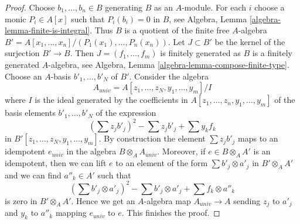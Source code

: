 \documentclass[10pt,a4paper]{amsart}
\theoremstyle{plain}
\theoremstyle{definition}
\theoremstyle{remark}
\numberwithin{equation}{subsection}
\begin{document}
\begin{proof}
Choose $b_1, \ldots, b_n \in B$ generating $B$ as an $A$-module.
For each $i$ choose a monic $P_i \in A[x]$ such that $P_i(b_i) = 0$
in $B$, see Algebra, Lemma \ref{algebra-lemma-finite-is-integral}.
Thus $B$ is a quotient of the finite free $A$-algebra
$B' = A[x_1, \ldots, x_n]/(P_1(x_1), \ldots, P_n(x_n))$.
Let $J \subset B'$ be the kernel of the surjection $B' \to B$.
Then $J =(f_1, \ldots, f_m)$ is finitely generated as $B$
is a finitely generated $A$-algebra, see
Algebra, Lemma \ref{algebra-lemma-compose-finite-type}.
Choose an $A$-basis $b'_1, \ldots, b'_N$ of $B'$.
Consider the algebra
$$
A_{univ} = A[z_1, \ldots, z_N, y_1, \ldots, y_m]/I
$$
where $I$ is the ideal generated by the coefficients in
$A[z_1, \ldots, z_n, y_1, \ldots, y_m]$
of the basis elements $b'_1, \ldots, b'_N$ of the expression
$$
(\sum z_j b'_j)^2 - \sum z_j b'_j + \sum y_k f_k
$$
in $B'[z_1, \ldots, z_N, y_1, \ldots, y_m]$. By construction
the element $\sum z_j b'_j$ maps to an idempotent $e_{univ}$ in the
algebra $B \otimes_A A_{univ}$. Moreover, if $e \in B \otimes_A A'$
is an idempotent, then we can lift $e$ to an element of the form
$\sum b'_j \otimes a'_j$ in $B' \otimes_A A'$ and we can find
$a''_k \in A'$ such that
$$
(\sum b'_j \otimes a'_j)^2 - \sum b'_j \otimes a'_j + \sum f_k \otimes a''_k
$$
is zero in $B' \otimes_A A'$. Hence we get an $A$-algebra map
$A_{univ} \to A$ sending $z_j$ to $a'_j$ and $y_k$ to $a''_k$
mapping $e_{univ}$ to $e$. This finishes the proof.
\end{proof}
\end{document}
